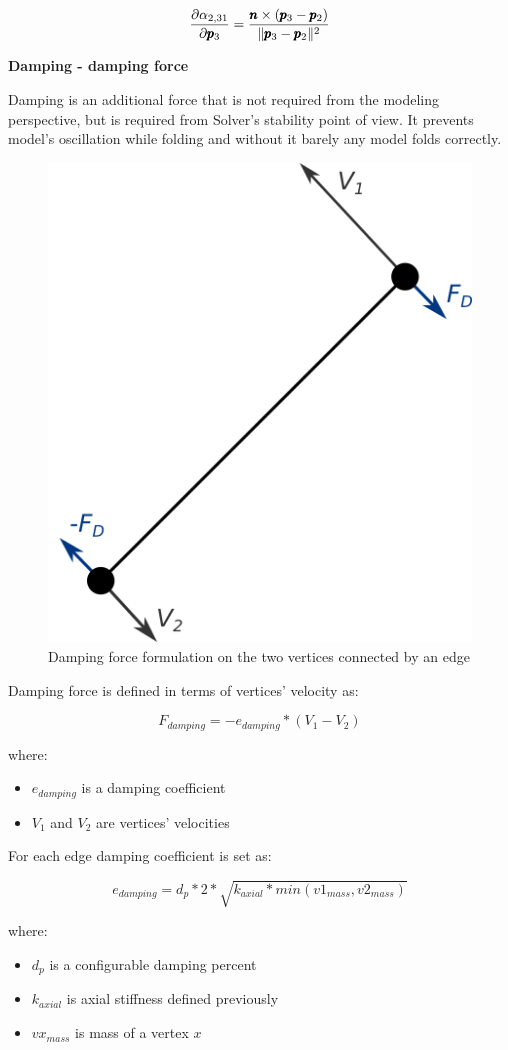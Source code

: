 \begin{equation} \label{Solver:face_force3}
	\frac{\partial \alpha _{2,31}}{\partial \pmb{p}_3} = \frac{\pmb{n} \times (\pmb{p}_3 - \pmb{p}_2)}{\|\pmb{p}_3 - \pmb{p}_2\|^2}
\end{equation}


\medskip
\textbf{Damping - damping force}
\smallskip

Damping is an additional force that is not required from the modeling perspective,
but is required from Solver's stability point of view. It prevents model's
oscillation while folding and without it barely any model folds correctly.

\begin{figure}[H]
	\caption{Damping force formulation on the two vertices connected by an edge}
    \centering
	\includegraphics[width=.4\linewidth]{assets/3-damping_force_edge.png}
\end{figure}

Damping force is defined in terms of vertices' velocity as:


$$F_{damping} = -e_{damping} * (V_1 - V_2)$$

where:

\begin{itemize}
	\item $e_{damping}$ is a damping coefficient 
	\item $V_1$ and $V_2$ are vertices' velocities
\end{itemize}

For each edge damping coefficient is set as:

$$ e_{damping} = d_p * 2 * \sqrt{k_{axial} * min(v1_{mass}, v2_{mass})} $$

where:

\begin{itemize}
	\item $d_p$ is a configurable damping percent
	\item $k_{axial}$ is axial stiffness defined previously
	\item $vx_{mass}$ is mass of a vertex $x$
\end{itemize}

